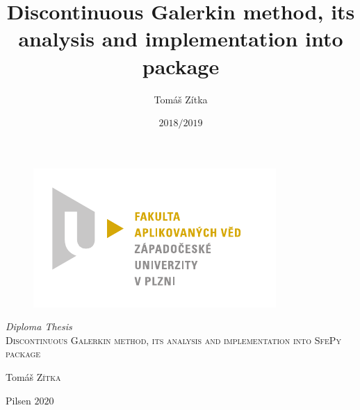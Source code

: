 \documentclass{book}
\title{Discontinuous Galerkin method, its analysis and implementation into \sfepy{} package}
\author{Tomáš Zítka}
\date{$2018/2019$}
\theoremstyle{definition}
\numberwithin{equation}{section}
\numberwithin{table}{section}
\begin{document}
\begin{titlepage}	 
	\begin{figure}[h]
 	 \centering
 	 \includegraphics[scale=1]{./fav_cmyk.pdf}
 	\end{figure}
 	\center %
 	
	\textit{{\large Diploma Thesis}}\\[1.5cm]
	\textsc{\LARGE  Discontinuous Galerkin method, its analysis and 
	implementation into SfePy package}\\

	\vfill
	\begin{minipage}{0.4 \textwidth}
		\begin{flushleft}
		Tomáš \textsc{Zítka}\\
		\end{flushleft}	
	\end{minipage}
	\begin{minipage}{0.4\textwidth}	
		\begin{flushright}
		Pilsen $2020$
		\end{flushright}
	\end{minipage}
\end{titlepage}
\end{document}
